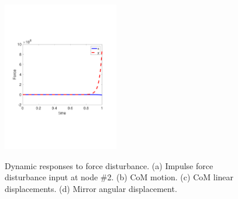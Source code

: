 \begin{figure}
{	\includegraphics[width=0.45\textwidth,trim=0.8cm 6cm 2cm 6cm,clip]{Figures/Q5P1_real_CoM_LinDisp.pdf}}
	\caption{Dynamic responses to force disturbance. (a) Impulse force disturbance input at node \#2. (b) CoM motion. (c) CoM linear displacements. (d) Mirror angular displacement.}
	\label{motionPlots}
\end{figure}

